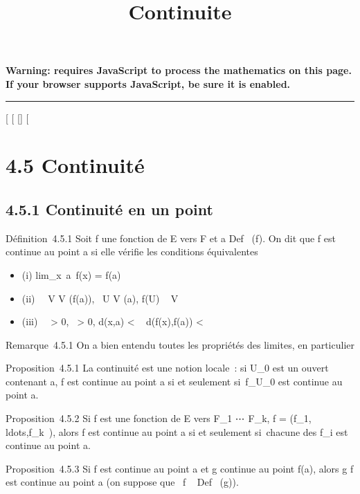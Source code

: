 \documentclass[]{article}
\title{Continuite}
\author{}
\date{}
\begin{document}
\maketitle

\textbf{Warning: 
requires JavaScript to process the mathematics on this page.\\ If your
browser supports JavaScript, be sure it is enabled.}

\begin{center}\rule{3in}{0.4pt}\end{center}

[
[
[]
[

\section{4.5 Continuité}

\subsection{4.5.1 Continuité en un point}

Définition~4.5.1 Soit f une fonction de E vers F et a
\in Def~ (f). On dit que f est continue au point
a si elle vérifie les conditions équivalentes

\begin{itemize}
\itemsep1pt\parskip0pt
\item
  (i) lim_x\rightarrow~a~f(x) = f(a)
\item
  (ii) \forall~~V \in V (f(a)),
  \exists~U \in V (a), f(U) \subset~ V
\item
  (iii) \forall~~\epsilon > 0,
  \exists~\eta > 0, d(x,a) < \eta \rigtharrow~
  d(f(x),f(a)) < \epsilon
\end{itemize}

Remarque~4.5.1 On a bien entendu toutes les propriétés des limites, en
particulier

Proposition~4.5.1 La continuité est une notion locale~: si U_0
est un ouvert contenant a, f est continue au point a si et seulement
si~f_U_0 est continue au point a.

Proposition~4.5.2 Si f est une fonction de E vers F_1
\times⋯ \times F_k, f =
(f_1,\\ldots,f_k~),
alors f est continue au point a si et seulement si~chacune des
f_i est continue au point a.

Proposition~4.5.3 Si f est continue au point a et g continue au point
f(a), alors g \cdot f est continue au point a (on suppose que
\mathrmIm~f
\subset~ Def~ (g)).
\end{document}
